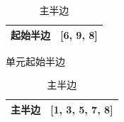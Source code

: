 \documentclass[notheorems,serif]{beamer}
\begin{document}
\begin{frame}
\begin{onlyenv}
\begin{columns}
    \end{columns}
    \begin{table}[htb]
        \begin{minipage}[b]{.5\linewidth}
            \centering
            \begin{tabular}{cc}
                \hline
                起始半边 & [6, 9, 8]\\
                \hline
            \end{tabular}
            \caption{单元起始半边}
        \end{minipage}%
        \begin{minipage}[b]{.5\linewidth}
            \begin{tabular}{cc}
                \hline
                主半边 & [1, 3, 5, 7, 8]\\
                \hline
            \end{tabular}
            \caption{主半边}
        \end{minipage}
    \end{table}
    \end{onlyenv}
\end{frame}
\end{document}
